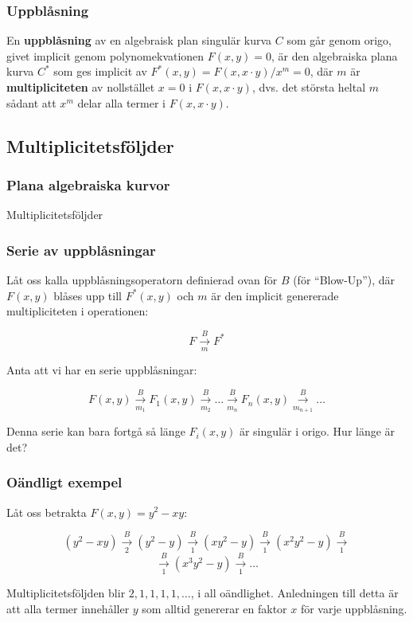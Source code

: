 \documentclass{beamer}
\begin{document}
\begin{frame}
	\frametitle{Uppblåsning}
\begin{Definition}
	En \textbf{uppblåsning} av en algebraisk plan singulär kurva $C$ som går genom origo, givet implicit genom polynomekvationen $F(x,y)=0$, är den algebraiska plana kurva $C^*$ som ges implicit av $F^*(x,y) = F(x,x\cdot y)/x^m=0$, där $m$ är \textbf{multipliciteten} av nollstället $x=0$ i $F(x,x\cdot y)$, dvs. det största heltal $m$ sådant att $x^m$ delar alla termer i $F(x,x\cdot y)$.
\end{Definition}
\end{frame}

\subsection{Multiplicitetsföljder}

\begin{frame}
	\frametitle{Plana algebraiska kurvor}
	\begin{center}
		\Large Multiplicitetsföljder
	\end{center}
\end{frame}

\begin{frame}
	\frametitle{Serie av uppblåsningar}
Låt oss kalla uppblåsningsoperatorn definierad ovan för $B$ (för ``Blow-Up''), där $F(x,y)$ blåses upp till $F^*(x,y)$ och $m$ är den implicit genererade multipliciteten i operationen:

\[F \overset{B}{\underset{m}{\longrightarrow}} F^*\]

Anta att vi har en serie uppblåsningar:

\[
F(x,y) \overset{B}{\underset{m_1}{\longrightarrow}} F_1(x,y) \overset{B}{\underset{m_2}{\longrightarrow}} \ldots \overset{B}{\underset{m_n}{\longrightarrow}} F_n(x,y) \overset{B}{\underset{m_{n+1}}{\longrightarrow}} \ldots
\]

Denna serie kan bara fortgå så länge $F_i(x,y)$ är singulär i origo. Hur länge är det? 
\end{frame}

\begin{frame}
	\frametitle{Oändligt exempel}
	\begin{example}
		Låt oss betrakta $F(x,y)=y^2-xy$:
		
		\[
		(y^2-xy) \overset{B}{\underset{2}{\longrightarrow}} (y^2-y) \overset{B}{\underset{1}{\longrightarrow}} (xy^2-y) \overset{B}{\underset{1}{\longrightarrow}} (x^2y^2-y) 		
		\overset{B}{\underset{1}{\longrightarrow}}\]
		\[\overset{B}{\underset{1}{\longrightarrow}} (x^3y^2-y) \overset{B}{\underset{1}{\longrightarrow}} \ldots\]
		
		Multiplicitetsföljden blir $2,1,1,1,1,\ldots$, i all oändlighet. Anledningen till detta är att alla termer innehåller $y$ som alltid genererar en faktor $x$ för varje uppblåsning.
	\end{example}
\end{frame}
\end{document}
